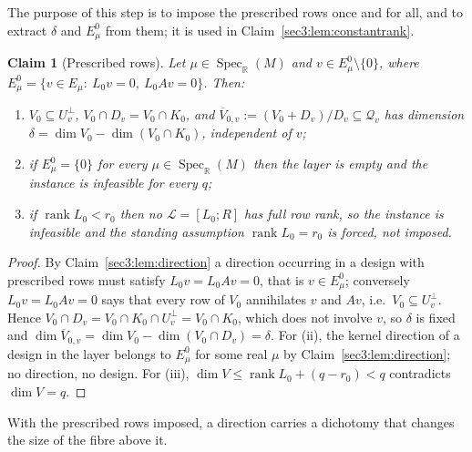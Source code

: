 \documentclass[journal]{IEEEtran}
\theoremstyle{plainn}
\newtheorem{claim}{Claim}
\theoremstyle{remark}
\newcommand{\rank}{\operatorname{rank}}
\begin{document}
The purpose of this step is to impose the prescribed rows once and for all, and to extract $\delta$
and $E_\mu^0$ from them; it is used in Claim~\ref{sec3:lem:constantrank}.

\begin{claim}[Prescribed rows]
\label{sec3:def:E0}
\label{sec3:lem:prescribed}
\label{sec3:cor:empty}
\label{sec3:proc}
\label{sec3:prop:rankcheck}
Let $\mu\in\operatorname{Spec}_{\mathbb{R}}(M)$ and $v\in E_\mu^0\setminus\{0\}$, where
$E_\mu^0=\{v\in E_\mu:\ L_0v=0,\ L_0Av=0\}$. Then:
\begin{enumerate}[label=(\roman*),leftmargin=*,itemsep=1pt,topsep=2pt]
\item $V_0\subseteq U_v^\perp$, $V_0\cap D_v=V_0\cap K_0$, and
$\overline{V}_{0,v}:=(V_0+D_v)/D_v\subseteq\mathcal{Q}_v$ has dimension
$\delta=\dim V_0-\dim(V_0\cap K_0)$, independent of $v$;
\item if $E_\mu^0=\{0\}$ for every $\mu\in\operatorname{Spec}_{\mathbb{R}}(M)$ then the layer is empty
and the instance is infeasible for every $q$;
\item if $\rank L_0<r_0$ then no $\mathcal{L}=[L_0;R]$ has full row rank, so the instance is
infeasible and the standing assumption $\rank L_0=r_0$ is forced, not imposed.
\end{enumerate}
\end{claim}
\begin{proof}
By Claim~\ref{sec3:lem:direction} a direction occurring in a design with prescribed rows must satisfy
$L_0v=L_0Av=0$, that is $v\in E_\mu^0$; conversely $L_0v=L_0Av=0$ says that every row of $V_0$
annihilates $v$ and $Av$, i.e.\ $V_0\subseteq U_v^\perp$. Hence
$V_0\cap D_v=V_0\cap K_0\cap U_v^\perp=V_0\cap K_0$, which does not involve $v$, so $\delta$ is fixed
and $\dim\overline{V}_{0,v}=\dim V_0-\dim(V_0\cap D_v)=\delta$. For (ii), the kernel direction of a
design in the layer belongs to $E_\mu^0$ for some real $\mu$ by Claim~\ref{sec3:lem:direction}; no
direction, no design. For (iii), $\dim V\le\rank L_0+(q-r_0)<q$ contradicts $\dim V=q$.
\end{proof}


With the prescribed rows imposed, a direction carries a dichotomy that changes the size of the fibre
above it.
\end{document}

